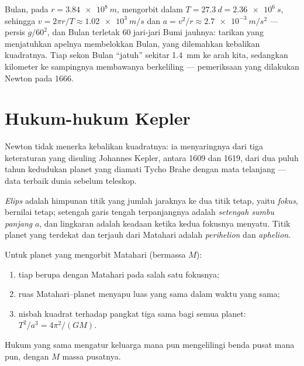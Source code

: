 \begin{example}\label{ex:g12:satellites-kepler:moon}
Bulan, pada $r = \qty{3.84e8}{m}$, mengorbit dalam $T = \qty{27.3}{d} =
\qty{2.36e6}{s}$, sehingga $v = 2\pi r/T \approx \qty{1.02e3}{m/s}$ dan
$a = v^2/r \approx \qty{2.7e-3}{m/s^2}$ --- persis $g/60^2$, dan
Bulan terletak $60$ jari-jari Bumi jauhnya: tarikan yang menjatuhkan apelnya
membelokkan Bulan, yang dilemahkan kebalikan kuadratnya. Tiap sekon Bulan
``jatuh'' sekitar \qty{1.4}{mm} ke arah kita, sedangkan kilometer ke
sampingnya membawanya berkeliling --- pemeriksaan yang dilakukan Newton pada 1666.
\end{example}

\section{Hukum-hukum Kepler}

Newton tidak menerka kebalikan kuadratnya: ia menyaringnya dari tiga
keteraturan yang disuling Johannes Kepler, antara 1609 dan 1619, dari dua
puluh tahun kedudukan planet yang diamati Tycho Brahe dengan mata telanjang
--- data terbaik dunia sebelum teleskop.

\begin{definition}[Elips]\label{def:g12:satellites-kepler:ellipse}
\emph{Elips} adalah himpunan titik yang jumlah jaraknya ke dua
titik tetap, yaitu \emph{fokus}, bernilai tetap;
setengah garis tengah terpanjangnya adalah \emph{setengah sumbu
panjang} $a$, dan lingkaran adalah keadaan
ketika kedua fokusnya menyatu. Titik  planet yang terdekat dan terjauh
dari Matahari adalah \emph{perihelion}
dan \emph{aphelion}.
\end{definition}

\begin{theorem}\label{thm:g12:satellites-kepler:kepler}
%
Untuk planet yang mengorbit Matahari (bermassa $M$):
\begin{enumerate}
  \item tiap  berupa  dengan Matahari pada salah satu fokusnya;
  \item ruas Matahari--planet menyapu luas yang sama dalam waktu yang sama;
  \item nisbah kuadrat  terhadap pangkat tiga  sama bagi semua planet: $T^2/a^3 = 4\pi^2/(G M)$.
\end{enumerate}
Hukum yang sama mengatur keluarga  mana pun mengelilingi benda pusat
mana pun, dengan $M$ massa pusatnya. \admitted
\end{theorem}

